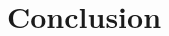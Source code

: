 \documentclass[11pt]{article}
\begin{document}
\begin{adjustbox}{width=\columnwidth,center}

\end{adjustbox}

\section{Conclusion}



\newpage
\printbibliography
\end{document}
